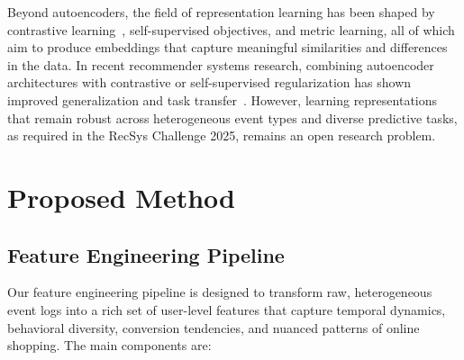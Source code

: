 \documentclass[sigconf]{acmart}
\begin{document}
Beyond autoencoders, the field of representation learning has been shaped by contrastive learning~\cite{Oord2018, Chen2020SimCLR}, self-supervised objectives, and metric learning, all of which aim to produce embeddings that capture meaningful similarities and differences in the data. In recent recommender systems research, combining autoencoder architectures with contrastive or self-supervised regularization has shown improved generalization and task transfer~\cite{Zhou2020S3Rec, Zhan2022CLAES}. However, learning representations that remain robust across heterogeneous event types and diverse predictive tasks, as required in the RecSys Challenge 2025, remains an open research problem.

\section{Proposed Method}
\label{sec:method}
\subsection{Feature Engineering Pipeline}
Our feature engineering pipeline is designed to transform raw, heterogeneous event logs into a rich set of user-level features that capture temporal dynamics, behavioral diversity, conversion tendencies, and nuanced patterns of online shopping. The main components are:
\end{document}
